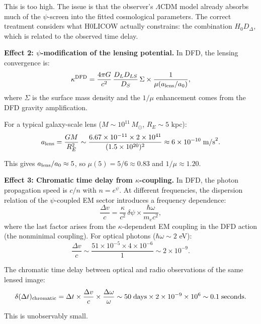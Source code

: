 \documentclass[11pt]{article}
\newcommand{\ee}[1]{\times 10^{#1}}
\begin{document}
This is too high. The issue is that the observer's $\Lambda$CDM model already absorbs much of the $\psi$-screen into the fitted cosmological parameters. The correct treatment considers what H0LICOW actually constrains: the combination $H_0 D_\Delta$, which is related to the observed time delay.

\textbf{Effect 2: $\psi$-modification of the lensing potential.} In DFD, the lensing convergence is:
\begin{equation}
\kappa^{\rm DFD} = \frac{4\pi G}{c^2}\,\frac{D_L D_{LS}}{D_S}\,\Sigma \times \frac{1}{\mu(a_{\rm lens}/a_0)},
\end{equation}
where $\Sigma$ is the surface mass density and the $1/\mu$ enhancement comes from the DFD gravity amplification.

For a typical galaxy-scale lens ($M \sim 10^{11}\,M_\odot$, $R_E \sim 5$ kpc):
\begin{equation}
a_{\rm lens} = \frac{GM}{R_E^2} \sim \frac{6.67\ee{-11}\times 2\ee{41}}{(1.5\ee{20})^2} \approx 6\ee{-10}\;\text{m/s}^2.
\end{equation}

This gives $a_{\rm lens}/a_0 \approx 5$, so $\mu(5) = 5/6 \approx 0.83$ and $1/\mu \approx 1.20$.

\textbf{Effect 3: Chromatic time delay from $\kappa$-coupling.} In DFD, the photon propagation speed is $c/n$ with $n = e^\psi$. At different frequencies, the dispersion relation of the $\psi$-coupled EM sector introduces a frequency dependence:
\begin{equation}
\frac{\Delta v}{c} = \frac{\kappa}{c^2}\,\delta\psi \times \frac{\hbar\omega}{m_e c^2},
\end{equation}
where the last factor arises from the $\kappa$-dependent EM coupling in the DFD action (the nonminimal coupling). For optical photons ($\hbar\omega \sim 2$ eV):
\begin{equation}
\frac{\Delta v}{c} \sim \frac{51 \times 10^{-5} \times 4\ee{-6}}{1} \sim 2\ee{-9}.
\end{equation}

The chromatic time delay between optical and radio observations of the same lensed image:
\begin{equation}
\delta(\Delta t)_{\rm chromatic} = \Delta t \times \frac{\Delta v}{c} \times \frac{\Delta\omega}{\omega} \sim 50\;\text{days}\times 2\ee{-9} \times 10^6 \sim 0.1\;\text{seconds}.
\end{equation}

This is unobservably small.
\end{document}
